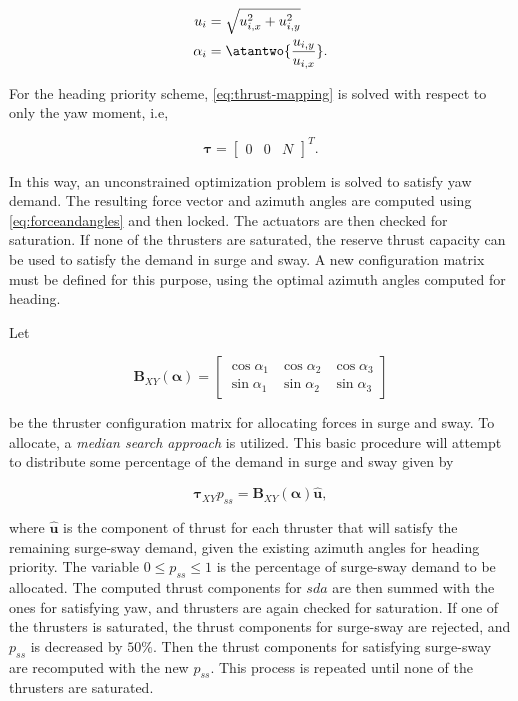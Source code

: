 \begin{subequations}
\begin{align}
    \label{eq:forceandangles}
    u_i &= \sqrt{u_{i,x}^2 + u_{i,y}^2} \\
    \alpha_i &= \atantwo{\frac{u_{i,y}}{u_{i,x}}}.
\end{align}
\end{subequations}


For the heading priority scheme, \eqref{eq:thrust-mapping} is solved with respect to only the yaw moment, i.e,

\begin{equation}
    \boldsymbol{\tau} = \begin{bmatrix}0 & 0 & N \end{bmatrix}^T.
\end{equation}

In this way, an unconstrained optimization problem is solved to satisfy yaw demand. The resulting force vector and azimuth angles are computed using \eqref{eq:forceandangles} and then locked. The actuators are then checked for saturation. If none of the thrusters are saturated, the reserve thrust capacity can be used to satisfy the demand in surge and sway. A new configuration matrix must be defined for this purpose, using the optimal azimuth angles computed for heading. 

Let 

\begin{equation}
    \mathbf{B}_{XY}(\boldsymbol{\alpha}) = \begin{bmatrix} \cos{\alpha_{1}} & \cos{\alpha_{2}} & \cos{\alpha_{3}} \\
    \sin{\alpha_{1}} & \sin{\alpha_{2}} & \sin{\alpha_{3}}\end{bmatrix}
\end{equation}

be the thruster configuration matrix for allocating forces in surge and sway. To allocate, a \textit{median search approach} is utilized. This basic procedure will attempt to distribute some percentage of the demand in surge and sway given by

\begin{equation}
    \boldsymbol{\tau}_{XY}p_{ss} = \mathbf{B}_{XY}(\boldsymbol{\alpha})\hat{\mathbf{u}},
\end{equation}

where $\hat{\mathbf{u}}$ is the component of thrust for each thruster that will satisfy the remaining surge-sway demand, given the existing azimuth angles for heading priority. The variable $0 \leq p_{ss} \leq 1$ is the percentage of surge-sway demand to be allocated. The computed thrust components for $sda$ are then summed with the ones for satisfying yaw, and thrusters are again checked for saturation. If one of the thrusters is saturated, the thrust components for surge-sway are rejected, and $p_{ss}$ is decreased by $50\%$. Then the thrust components for satisfying surge-sway are recomputed with the new $p_{ss}$. This process is repeated until none of the thrusters are saturated.